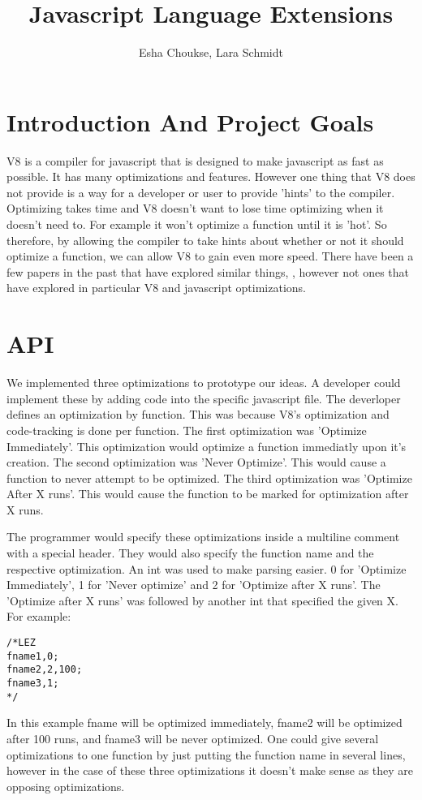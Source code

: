 \documentclass[twocolumn,showpacs,%
  nofootinbib,aps,superscriptaddress,%
  eqsecnum,prd,notitlepage,showkeys,10pt]{revtex4-1}
\begin{document}
\title{Javascript Language Extensions}
\author{Esha Choukse, Lara Schmidt}


\maketitle

\section{Introduction And Project Goals} 
V8 is a compiler for javascript that is designed to make javascript as fast as possible. It has many optimizations and features. However one thing that V8 does not provide is a way for a developer or user to provide 'hints' to the compiler. Optimizing takes time and V8 doesn't want to lose time optimizing when it doesn't need to. For example it won't optimize a function until it is 'hot'. So therefore, by allowing the compiler to take hints about whether or not it should optimize a function, we can allow V8 to gain even more speed. There have been a few papers in the past that have explored similar things, \cite{}, however not ones that have explored in particular V8 and javascript optimizations.

\section{API}
We implemented three optimizations to prototype our ideas. A developer could implement these by adding code into the specific javascript file. The deverloper defines an optimization by function. This was because V8's optimization and code-tracking is done per function. The first optimization was 'Optimize Immediately'. This optimization would optimize a function immediatly upon it's creation. The second optimization was 'Never Optimize'. This would cause a function to never attempt to be optimized. The third optimization was 'Optimize After X runs'. This would cause the function to be marked for optimization after X runs. 

The programmer would specify these optimizations inside a multiline comment with a special header. They would also specify the function name and the respective optimization. An int was used to make parsing easier. 0 for 'Optimize Immediately', 1 for 'Never optimize' and 2 for 'Optimize after X runs'. The 'Optimize after X runs' was followed by another int that specified the given X. For example:
\begin{lstlisting}
/*LEZ
fname1,0;
fname2,2,100;
fname3,1;
*/
\end{lstlisting}
In this example fname will be optimized immediately, fname2 will be optimized after 100 runs, and fname3 will be never optimized. One could give several optimizations to one function by just putting the function name in several lines, however in the case of these three optimizations it doesn't make sense as they are opposing optimizations.
\end{document}
